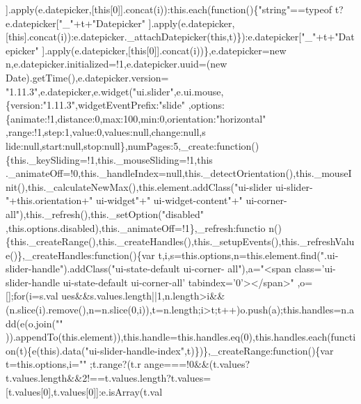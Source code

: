 \begin{DoxyCode}
{      ].apply(e.datepicker,[this[0]].concat(i)):this.each(function()\{"}\textcolor{keywordtype}{string}\textcolor{stringliteral}{"==typeof t?e.datepicker["}\_\textcolor{stringliteral}{"+t+"}Datepicker\textcolor{stringliteral}{"
      ].apply(e.datepicker,[this].concat(i)):e.datepicker.\_attachDatepicker(this,t)\}):e.datepicker["}\_\textcolor{stringliteral}{"+t+"}Datepicker\textcolor{stringliteral}{"
      ].apply(e.datepicker,[this[0]].concat(i))\},e.datepicker=new n,e.datepicker.initialized=!1,e.datepicker.uuid=(new Date).getTime(),e.datepicker.version=
      "}1.11.3\textcolor{stringliteral}{",e.datepicker,e.widget("}ui.slider\textcolor{stringliteral}{",e.ui.mouse,\{version:"}1.11.3\textcolor{stringliteral}{",widgetEventPrefix:"}slide\textcolor{stringliteral}{"
      ,options:\{animate:!1,distance:0,max:100,min:0,orientation:"}horizontal\textcolor{stringliteral}{"
      ,range:!1,step:1,value:0,values:null,change:null,s
      lide:null,start:null,stop:null\},numPages:5,\_create:function()\{this.\_keySliding=!1,this.\_mouseSliding=!1,this
      .\_animateOff=!0,this.\_handleIndex=null,this.\_detectOrientation(),this.\_mouseInit(),this.\_calculateNewMax(),this.element.addClass("}ui-slider ui-slider-\textcolor{stringliteral}{"+this.orientation+"} ui-widget\textcolor{stringliteral}{"+"} ui-widget-content\textcolor{stringliteral}{"+"} ui-corner-
      all\textcolor{stringliteral}{"),this.\_refresh(),this.\_setOption("}disabled\textcolor{stringliteral}{"
      ,this.options.disabled),this.\_animateOff=!1\},\_refresh:functio
      n()\{this.\_createRange(),this.\_createHandles(),this.\_setupEvents(),this.\_refreshValue()\},\_createHandles:function()\{var t,i,s=this.options,n=this.element.find("}.ui-slider-handle\textcolor{stringliteral}{").addClass("}ui-state-\textcolor{keywordflow}{default} ui-corner-
      all\textcolor{stringliteral}{"),a="}<span \textcolor{keyword}{class}=\textcolor{stringliteral}{'ui-slider-handle ui-state-default ui-corner-all'} tabindex=\textcolor{charliteral}{'0'}></span>\textcolor{stringliteral}{"
      ,o=[];for(i=s.val
      ues&&s.values.length||1,n.length>i&&(n.slice(i).remove(),n=n.slice(0,i)),t=n.length;i>t;t++)o.push(a);this.handles=n.add(e(o.join("}\textcolor{stringliteral}{"
      )).appendTo(this.element)),this.handle=this.handles.eq(0),this.handles.each(function(t)\{e(this).data("}ui-slider-handle-index\textcolor{stringliteral}{",t)\})\},\_createRange:function()\{var t=this.options,i="}\textcolor{stringliteral}{"
      ;t.range?(t.r
      ange===!0&&(t.values?t.values.length&&2!==t.values.length?t.values=[t.values[0],t.values[0]]:e.isArray(t.val
}
\end{DoxyCode}
